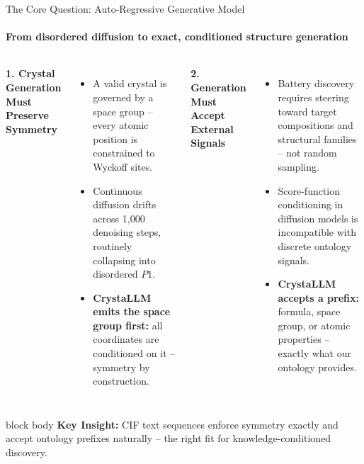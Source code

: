 \documentclass[aspectratio=169, 11pt]{beamer}
\begin{document}
\begin{frame}{The Core Question: Auto-Regressive Generative Model}
\framesubtitle{From disordered diffusion to exact, conditioned structure generation}

\vspace{-0.2cm}
\begin{columns}[T]
    \scriptsize
    \textbf{1. Crystal Generation Must Preserve Symmetry}
    \begin{itemize}\itemsep0.15em
        \item A valid crystal is governed by a space group -- every atomic position is constrained to Wyckoff sites.
        \item Continuous diffusion drifts across 1{,}000 denoising steps, routinely collapsing into disordered $P1$.
        \item \textbf{CrystaLLM emits the space group first:} all coordinates are conditioned on it -- symmetry by construction.
    \end{itemize}

    \scriptsize
    \textbf{2. Generation Must Accept External Signals}
    \begin{itemize}\itemsep0.15em
        \item Battery discovery requires steering toward target compositions and structural families -- not random sampling.
        \item Score-function conditioning in diffusion models is incompatible with discrete ontology signals.
        \item \textbf{CrystaLLM accepts a prefix:} formula, space group, or atomic properties -- exactly what our ontology provides.
    \end{itemize}
\end{columns}

\vspace{0.15cm}
\begin{beamercolorbox}[rounded=true, sep=2.5pt]{block body}
    \centering\scriptsize
    \textbf{Key Insight:} CIF text sequences enforce symmetry exactly and accept ontology prefixes naturally -- the right fit for knowledge-conditioned discovery.
\end{beamercolorbox}

\vspace{0.15cm}
\centering
{}
\end{frame}
\end{document}
